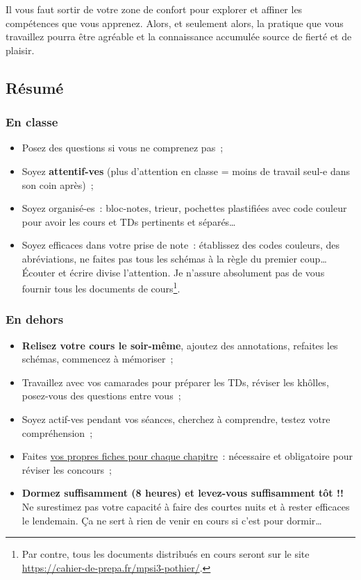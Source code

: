 \documentclass[a4paper, 10pt, final, garamond]{book}
\begin{document}
Il vous faut sortir de votre zone de confort pour explorer et affiner les
compétences que vous apprenez. Alors, et seulement alors, la pratique que vous
travaillez pourra être agréable et la connaissance accumulée source de fierté et
de plaisir.

\subsection{Résumé}
\subsubsection{En classe}
\begin{itemize}
	\item Posez des questions si vous ne comprenez pas~;
	\item Soyez \textbf{attentif-ves} (plus d'attention en classe = moins de
	      travail seul-e dans son coin après)~;
	\item Soyez organisé-es~: bloc-notes, trieur, pochettes plastifiées avec
	      code couleur pour avoir les cours et TDs pertinents et séparés…
	\item Soyez efficaces dans votre prise de note~: établissez des codes
	      couleurs, des abréviations, ne faites pas tous les schémas à la règle du
	      premier coup… Écouter et écrire divise l'attention. Je n'assure
	      absolument pas de vous fournir tous les documents de cours\footnote{Par
		      contre, tous les documents distribués en cours seront sur le site
		      \href{https://cahier-de-prepa.fr/mpsi3-pothier/}
		      {https://cahier-de-prepa.fr/mpsi3-pothier/}.}.
\end{itemize}

\subsubsection{En dehors}
\begin{itemize}
	\item \textbf{Relisez votre cours le soir-même}, ajoutez des annotations,
	      refaites les schémas, commencez à mémoriser~;
	\item Travaillez avec vos camarades pour préparer les TDs, réviser les
	      khôlles, posez-vous des questions entre vous~;
	\item Soyez actif-ves pendant vos séances, cherchez à comprendre, testez
	      votre compréhension~;
	\item Faites \underline{vos propres fiches pour chaque chapitre}~:
	      nécessaire et obligatoire pour réviser les concours~;
	\item \textbf{Dormez suffisamment (8 heures) et levez-vous suffisamment tôt
		      !!} Ne surestimez pas votre capacité à faire des courtes nuits et à
	      rester efficaces le lendemain. Ça ne sert à rien de venir en cours si
	      c'est pour dormir…
\end{itemize}
\end{document}
